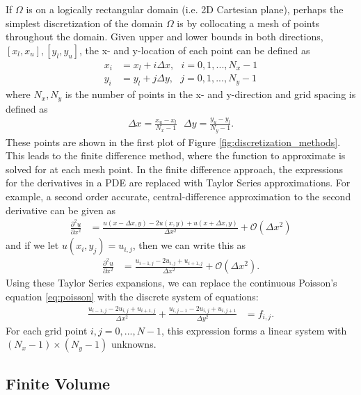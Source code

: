 If $\Omega$ is on a logically rectangular domain (i.e. 2D Cartesian plane), perhaps the simplest discretization of the domain $\Omega$ is by collocating a mesh of points throughout the domain. Given upper and lower bounds in both directions, $[x_l, x_u], [y_l, y_u]$, the x- and y-location of each point can be defined as
\begin{align}
    x_i &= x_l + i \Delta x,\ \ \ i = 0, 1, ..., N_x-1 \\
    y_i &= y_l + j \Delta y,\ \ \ j = 0, 1, ..., N_y-1
\end{align}
where $N_x, N_y$ is the number of points in the x- and y-direction and grid spacing is defined as
\begin{align}
    \Delta x = \frac{x_u - x_l}{N_x - 1} \ \ \ \Delta y = \frac{y_u - y_l}{N_y - 1}.
\end{align}
These points are shown in the first plot of Figure \ref{fig:discretization_methods}. This leads to the finite difference method, where the function to approximate is solved for at each mesh point. In the finite difference approach, the expressions for the derivatives in a PDE are replaced with Taylor Series approximations. For example, a second order accurate, central-difference approximation to the second derivative can be given as
\begin{align}
    \frac{\partial^2 u}{\partial x^2} &= \frac{u(x - \Delta x, y) - 2u(x, y) + u(x + \Delta x, y)}{\Delta x^2} + \mathcal{O}(\Delta x^2)
\end{align}
and if we let $u(x_i, y_j) = u_{i,j}$, then we can write this as
\begin{align}
    \frac{\partial^2 u}{\partial x^2} &= \frac{u_{i-1,j} - 2u_{i,j} + u_{i+1,j}}{\Delta x^2} + \mathcal{O}(\Delta x^2).
\end{align}
Using these Taylor Series expansions, we can replace the continuous Poisson's equation \ref{eq:poisson} with the discrete system of equations:
\begin{align}
    \frac{u_{i-1,j} - 2u_{i,j} + u_{i+1,j}}{\Delta x^2} + \frac{u_{i,j-1} - 2u_{i,j} + u_{i,j+1}}{\Delta y^2} &= f_{i,j}.
    \label{eq:poisson_FD}
\end{align}
For each grid point $i,j = 0,...,N - 1$, this expression forms a linear system with $(N_x-1) \times (N_y-1)$ unknowns.

\subsection{Finite Volume}

